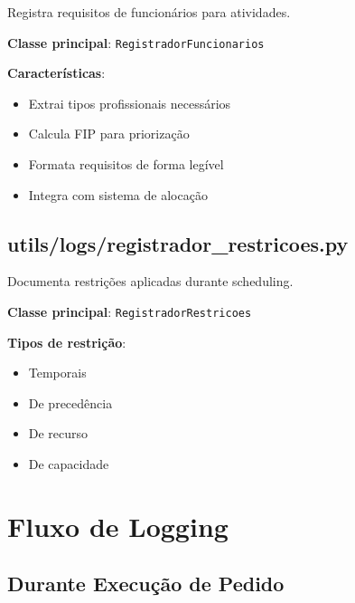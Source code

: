 \documentclass[11pt,a4paper]{article}
\begin{document}
Registra requisitos de funcionários para atividades.

\textbf{Classe principal}: \texttt{RegistradorFuncionarios}

\textbf{Características}:
\begin{itemize}
    \item Extrai tipos profissionais necessários
    \item Calcula FIP para priorização
    \item Formata requisitos de forma legível
    \item Integra com sistema de alocação
\end{itemize}

\subsection{utils/logs/registrador\_restricoes.py}

Documenta restrições aplicadas durante scheduling.

\textbf{Classe principal}: \texttt{RegistradorRestricoes}

\textbf{Tipos de restrição}:
\begin{itemize}
    \item Temporais
    \item De precedência
    \item De recurso
    \item De capacidade
\end{itemize}

\newpage

\section{Fluxo de Logging}

\subsection{Durante Execução de Pedido}
\end{document}
